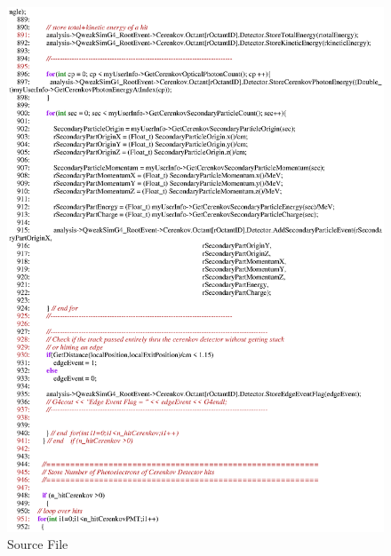 \begin{figure}[h]
  \hspace{0cm}
  \includegraphics[scale=0.8]{./figures13/QweakSimEventAction.cc-p16.eps}
  \caption{Source File}
           \label{fig:XIII-SC-31}
\end{figure}

\clearpage

